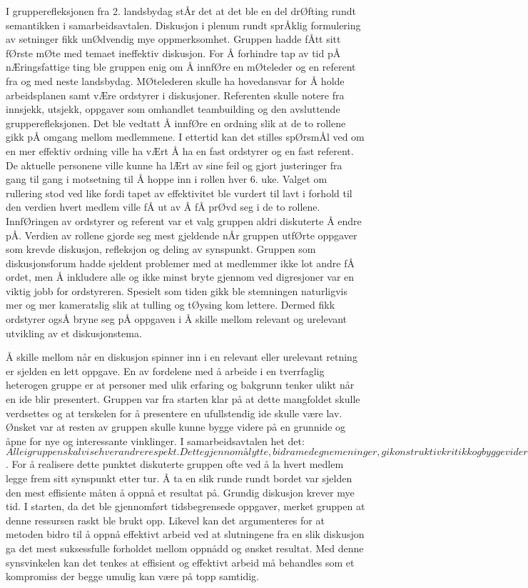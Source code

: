 I grupperefleksjonen fra 2. landsbydag stÅr det at det ble en del drØfting rundt semantikken i samarbeidsavtalen. 
Diskusjon i plenum rundt sprÅklig formulering av setninger fikk unØdvendig mye oppmerksomhet.
Gruppen hadde fÅtt sitt fØrste mØte med temaet ineffektiv diskusjon.
For Å forhindre tap av tid pÅ nÆringsfattige ting ble gruppen enig om Å innfØre en mØteleder og en referent fra og med neste landsbydag.
MØtelederen skulle ha hovedansvar for Å holde arbeidsplanen samt vÆre ordstyrer i diskusjoner.
Referenten skulle notere fra innsjekk, utsjekk, oppgaver som omhandlet teambuilding og den avsluttende grupperefleksjonen.
Det ble vedtatt Å innfØre en ordning slik at de to rollene gikk pÅ omgang mellom medlemmene.
I ettertid kan det stilles spØrsmÅl ved om en mer effektiv ordning ville ha vÆrt Å ha en fast ordstyrer og en fast referent.
De aktuelle personene ville kunne ha lÆrt av sine feil og gjort justeringer fra gang til gang i motsetning til Å hoppe inn i rollen hver 6. uke.
Valget om rullering stod ved like fordi tapet av effektivitet ble vurdert til lavt i forhold til den verdien hvert medlem ville fÅ ut av Å fÅ prØvd seg i de to rollene.
InnfØringen av ordstyrer og referent var et valg gruppen aldri diskuterte Å endre pÅ. 
Verdien av rollene gjorde seg mest gjeldende nÅr gruppen utfØrte oppgaver som krevde diskusjon, refleksjon og deling av synspunkt.
Gruppen som diskusjonsforum hadde sjeldent problemer med at medlemmer ikke lot andre fÅ ordet, men Å inkludere alle og ikke minst bryte gjennom ved digresjoner var en viktig jobb for ordstyreren. 
Spesielt som tiden gikk ble stemningen naturligvis mer og mer kameratslig slik at tulling og tØysing kom lettere.
Dermed fikk ordstyrer ogsÅ bryne seg pÅ oppgaven i Å skille mellom relevant og urelevant utvikling av et diskusjonstema.

Å skille mellom når en diskusjon spinner inn i en relevant eller urelevant retning er sjelden en lett oppgave.
En av fordelene med å arbeide i en tverrfaglig heterogen gruppe er at personer med ulik erfaring og bakgrunn tenker ulikt når en ide blir presentert.
Gruppen var fra starten klar på at dette mangfoldet skulle verdsettes og at terskelen for å presentere en ufullstendig ide skulle være lav.
Ønsket var at resten av gruppen skulle kunne bygge videre på en grunnide og åpne for nye og interessante vinklinger. 
I samarbeidsavtalen het det: $Alle i gruppen skal vise hverandre respekt. Dette gjennom å lytte, bidra med egne meninger, gi konstruktiv kritikk og bygge videre på andres ideer.$.
For å realisere dette punktet diskuterte gruppen ofte ved å la hvert medlem legge frem sitt synspunkt etter tur.
Å ta en slik runde rundt bordet var sjelden den mest effisiente måten å oppnå et resultat på.
Grundig diskusjon krever mye tid. 
I starten, da det ble gjennomført tidsbegrensede oppgaver, merket gruppen at denne ressursen raskt ble brukt opp.
Likevel kan det argumenteres for at metoden bidro til å oppnå effektivt arbeid ved at slutningene fra en slik diskusjon ga det mest suksessfulle forholdet mellom oppnådd og ønsket resultat.
Med denne synsvinkelen kan det tenkes at effisient og effektivt arbeid må behandles som et kompromiss der begge umulig kan være på topp samtidig.



